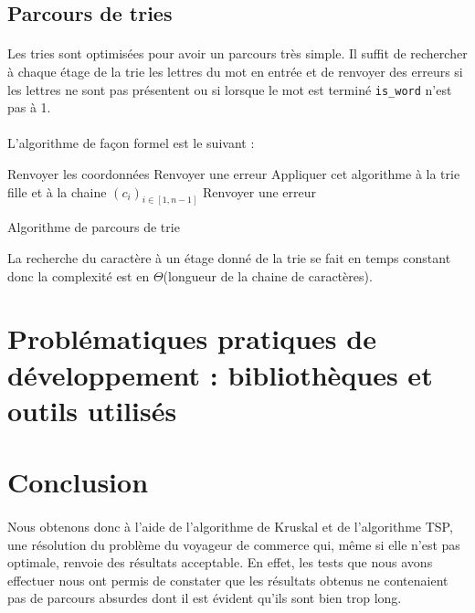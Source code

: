 \documentclass[a4paper]{article}
\begin{document}
\subsection{Parcours de tries}

\paragraph*{}Les tries sont optimisées pour avoir un parcours très simple. Il suffit de rechercher à chaque étage de la trie les lettres du mot en entrée et de renvoyer des erreurs si les lettres ne sont pas présentent ou si lorsque le mot est terminé \texttt{is\_word} n'est pas à 1.
\paragraph*{}L'algorithme de façon formel est le suivant :
\medskip

\begin{algorithm}[H]
  \SetAlgoLined
   {
     {
       {
        Renvoyer les coordonnées\;
      }{
        Renvoyer une erreur\;
      }
    }{
      Appliquer cet algorithme à la trie fille et à la chaine $(c_i)_{i \in [1,n-1]}$ \;
    }
  }{
    Renvoyer une erreur\;
  }
\caption{Algorithme de parcours de trie}
\end{algorithm}

\medskip

La recherche du caractère à un étage donné de la trie se fait en temps constant donc la complexité est en $\Theta$(longueur de la chaine de caractères).

\section{Problématiques pratiques de développement : bibliothèques et outils utilisés}


\section*{Conclusion}
\paragraph*{}
Nous obtenons donc à l'aide de l'algorithme de Kruskal et de l'algorithme TSP, une résolution du problème du voyageur de commerce qui, même si elle n'est pas optimale, renvoie des résultats acceptable. En effet, les tests que nous avons effectuer nous ont permis de constater que les résultats obtenus ne contenaient pas de parcours absurdes dont il est évident qu'ils sont bien trop long.
\end{document}
